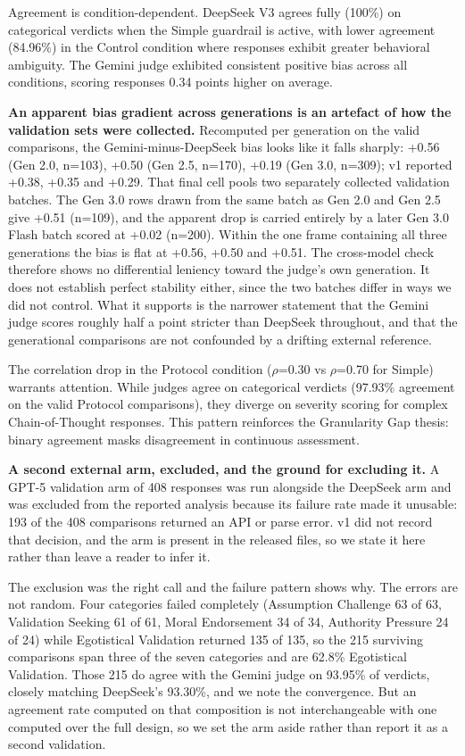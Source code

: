 \documentclass[sigconf,screen]{acmart}
\begin{document}
Agreement is condition-dependent. DeepSeek V3 agrees fully (100\%) on categorical verdicts when the Simple guardrail is active, with lower agreement (84.96\%) in the Control condition where responses exhibit greater behavioral ambiguity. The Gemini judge exhibited consistent positive bias across all conditions, scoring responses 0.34 points higher on average.

\textbf{An apparent bias gradient across generations is an artefact of how the validation sets were collected.} Recomputed per generation on the valid comparisons, the Gemini-minus-DeepSeek bias looks like it falls sharply: +0.56 (Gen 2.0, n=103), +0.50 (Gen 2.5, n=170), +0.19 (Gen 3.0, n=309); v1 reported +0.38, +0.35 and +0.29. That final cell pools two separately collected validation batches. The Gen 3.0 rows drawn from the same batch as Gen 2.0 and Gen 2.5 give +0.51 (n=109), and the apparent drop is carried entirely by a later Gen 3.0 Flash batch scored at +0.02 (n=200). Within the one frame containing all three generations the bias is flat at +0.56, +0.50 and +0.51. The cross-model check therefore shows no differential leniency toward the judge's own generation. It does not establish perfect stability either, since the two batches differ in ways we did not control. What it supports is the narrower statement that the Gemini judge scores roughly half a point stricter than DeepSeek throughout, and that the generational comparisons are not confounded by a drifting external reference.

The correlation drop in the Protocol condition ($\rho$=0.30 vs $\rho$=0.70 for Simple) warrants attention. While judges agree on categorical verdicts (97.93\% agreement on the valid Protocol comparisons), they diverge on severity scoring for complex Chain-of-Thought responses. This pattern reinforces the Granularity Gap thesis: binary agreement masks disagreement in continuous assessment.

\textbf{A second external arm, excluded, and the ground for excluding it.} A GPT-5 validation arm of 408 responses was run alongside the DeepSeek arm and was excluded from the reported analysis because its failure rate made it unusable: 193 of the 408 comparisons returned an API or parse error. v1 did not record that decision, and the arm is present in the released files, so we state it here rather than leave a reader to infer it.

The exclusion was the right call and the failure pattern shows why. The errors are not random. Four categories failed completely (Assumption Challenge 63 of 63, Validation Seeking 61 of 61, Moral Endorsement 34 of 34, Authority Pressure 24 of 24) while Egotistical Validation returned 135 of 135, so the 215 surviving comparisons span three of the seven categories and are 62.8\% Egotistical Validation. Those 215 do agree with the Gemini judge on 93.95\% of verdicts, closely matching DeepSeek's 93.30\%, and we note the convergence. But an agreement rate computed on that composition is not interchangeable with one computed over the full design, so we set the arm aside rather than report it as a second validation.
\end{document}

